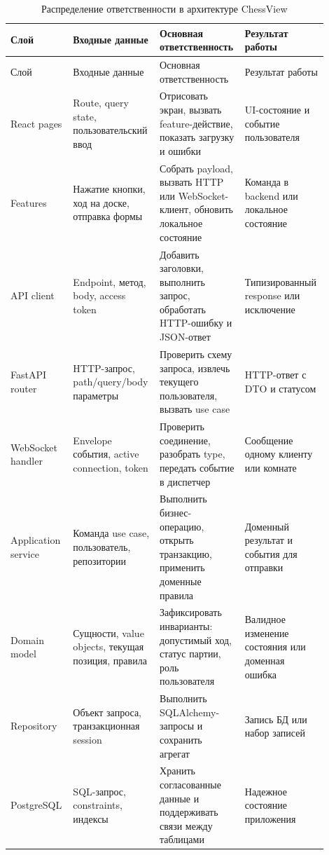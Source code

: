 \noindent\scriptsize
\setlength{\tabcolsep}{3pt}
\renewcommand{\arraystretch}{1.16}
\begin{longtable}{|>{\RaggedRight\arraybackslash}p{0.19\linewidth}|>{\RaggedRight\arraybackslash}p{0.24\linewidth}|>{\RaggedRight\arraybackslash}p{0.24\linewidth}|>{\RaggedRight\arraybackslash}p{0.23\linewidth}|}
\caption{Распределение ответственности в архитектуре ChessView}\label{tab:architecture-responsibility}\\
\hline
Слой & Входные данные & Основная ответственность & Результат работы\\ \hline
\endfirsthead
\hline
Слой & Входные данные & Основная ответственность & Результат работы\\ \hline
\endhead
React pages & Route, query state, пользовательский ввод & Отрисовать экран, вызвать feature-действие, показать загрузку и ошибки & UI-состояние и событие пользователя\\ \hline
Features & Нажатие кнопки, ход на доске, отправка формы & Собрать payload, вызвать HTTP или WebSocket-клиент, обновить локальное состояние & Команда в backend или локальное состояние\\ \hline
API client & Endpoint, метод, body, access token & Добавить заголовки, выполнить запрос, обработать HTTP-ошибку и JSON-ответ & Типизированный response или исключение\\ \hline
FastAPI router & HTTP-запрос, path/query/body параметры & Проверить схему запроса, извлечь текущего пользователя, вызвать use case & HTTP-ответ с DTO и статусом\\ \hline
WebSocket handler & Envelope события, active connection, token & Проверить соединение, разобрать type, передать событие в диспетчер & Сообщение одному клиенту или комнате\\ \hline
Application service & Команда use case, пользователь, репозитории & Выполнить бизнес-операцию, открыть транзакцию, применить доменные правила & Доменный результат и события для отправки\\ \hline
Domain model & Сущности, value objects, текущая позиция, правила & Зафиксировать инварианты: допустимый ход, статус партии, роль пользователя & Валидное изменение состояния или доменная ошибка\\ \hline
Repository & Объект запроса, транзакционная session & Выполнить SQLAlchemy-запросы и сохранить агрегат & Запись БД или набор записей\\ \hline
PostgreSQL & SQL-запрос, constraints, индексы & Хранить согласованные данные и поддерживать связи между таблицами & Надежное состояние приложения\\ \hline
\end{longtable}
\normalsize

